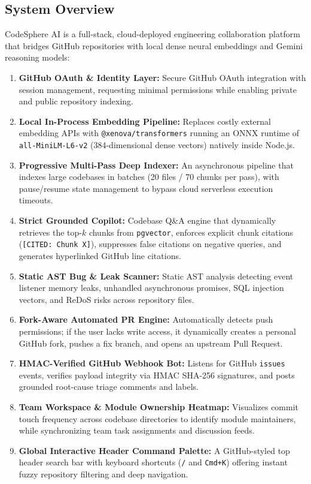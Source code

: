 \documentclass[11pt,a4paper]{article}
\begin{document}
\subsection{System Overview}
CodeSphere AI is a full-stack, cloud-deployed engineering collaboration platform that bridges GitHub repositories with local dense neural embeddings and Gemini reasoning models:
\begin{enumerate}
    \item \textbf{GitHub OAuth \& Identity Layer:} Secure GitHub OAuth integration with session management, requesting minimal permissions while enabling private and public repository indexing.
    \item \textbf{Local In-Process Embedding Pipeline:} Replaces costly external embedding APIs with \texttt{@xenova/transformers} running an ONNX runtime of \texttt{all-MiniLM-L6-v2} (384-dimensional dense vectors) natively inside Node.js.
    \item \textbf{Progressive Multi-Pass Deep Indexer:} An asynchronous pipeline that indexes large codebases in batches (20 files / 70 chunks per pass), with pause/resume state management to bypass cloud serverless execution timeouts.
    \item \textbf{Strict Grounded Copilot:} Codebase Q\&A engine that dynamically retrieves the top-$k$ chunks from \texttt{pgvector}, enforces explicit chunk citations (\texttt{[CITED: Chunk X]}), suppresses false citations on negative queries, and generates hyperlinked GitHub line citations.
    \item \textbf{Static AST Bug \& Leak Scanner:} Static AST analysis detecting event listener memory leaks, unhandled asynchronous promises, SQL injection vectors, and ReDoS risks across repository files.
    \item \textbf{Fork-Aware Automated PR Engine:} Automatically detects push permissions; if the user lacks write access, it dynamically creates a personal GitHub fork, pushes a fix branch, and opens an upstream Pull Request.
    \item \textbf{HMAC-Verified GitHub Webhook Bot:} Listens for GitHub \texttt{issues} events, verifies payload integrity via HMAC SHA-256 signatures, and posts grounded root-cause triage comments and labels.
    \item \textbf{Team Workspace \& Module Ownership Heatmap:} Visualizes commit touch frequency across codebase directories to identify module maintainers, while synchronizing team task assignments and discussion feeds.
    \item \textbf{Global Interactive Header Command Palette:} A GitHub-styled top header search bar with keyboard shortcuts (\texttt{/} and \texttt{Cmd+K}) offering instant fuzzy repository filtering and deep navigation.
\end{enumerate}
\end{document}
